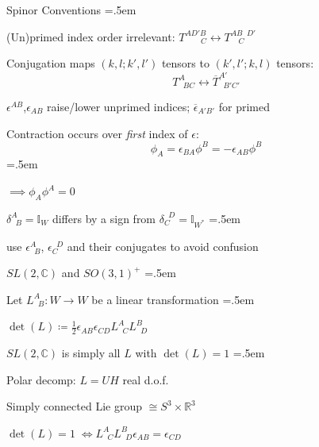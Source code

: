 \documentclass[xcolor={dvipsnames}]{beamer}
\let\olditemize=\itemize
\let\endolditemize=\enditemize
\renewenvironment{itemize}{\olditemize \itemsep=.5em }{\endolditemize}
\begin{document}
\begin{frame}{Spinor Conventions}
    \begin{itemize}
        \item<2-> (Un)primed index order irrelevant: $T_{\qquad C}^{AD'B} \leftrightarrow T_{\quad C}^{AB\;\;D'}$ 
        \item<3-> Conjugation maps $(k,l;k',l')$ tensors to $(k',l';k,l)$ tensors: $$T_{\;\;BC}^A \leftrightarrow \overline{T}_{\;\;B'C'}^{A'}$$
        \item<4-> $\epsilon^{AB}$,$\epsilon_{AB}$ raise/lower unprimed indices; $\overline{\epsilon}_{A'B'}$ for primed
        \item<5-> Contraction occurs over \textit{first} index of $\epsilon$: \[ \phi_A = \epsilon_{BA}\phi^B = -\epsilon_{AB}\phi^{B} \]
        \begin{itemize}
            \item<6-> $\implies \phi_A \phi^A = 0$
        \end{itemize}
        \item<7-> $\delta_{\;\;B}^A = \mathbb{I}_W$ differs by a sign from $\delta_C^{\;\;D} = \mathbb{I}_{W^*}$
        \begin{itemize}
            \item<8-> \textrightarrow\; use $\epsilon_{\;\;B}^A$, $\epsilon_C^{\;\;D}$ and their conjugates to avoid confusion
        \end{itemize}
    \end{itemize}
\end{frame}

\begin{frame}{$SL(2, \mathbb{C})$ and $SO(3, 1)^+$}
    \begin{itemize}
        \item<2-> Let $L_{\;\;B}^A : W\rightarrow W$ be a linear transformation
        \begin{itemize}
            \item<3-> $\det(L) \coloneqq \frac{1}{2}\epsilon_{AB}\epsilon_{CD}L_{\;\;C}^AL_{\;\;D}^B$
        \end{itemize}
        \item<4-> $SL(2, \mathbb{C})$ is simply all $L$ with $\det(L) = 1$
        \begin{itemize}
            \item<5-> Polar decomp: $L = UH$ \textrightarrow{} real d.o.f.
            \item<6-> Simply connected Lie group $\cong S^3\times\mathbb{R}^3$
            \item<7-> $\det(L)=1 \; \iff L_{\;\;C}^A L_{\;\;D}^B \epsilon_{AB} = \epsilon_{CD}$
        \end{itemize}
    \end{itemize}
\end{frame}
\end{document}
